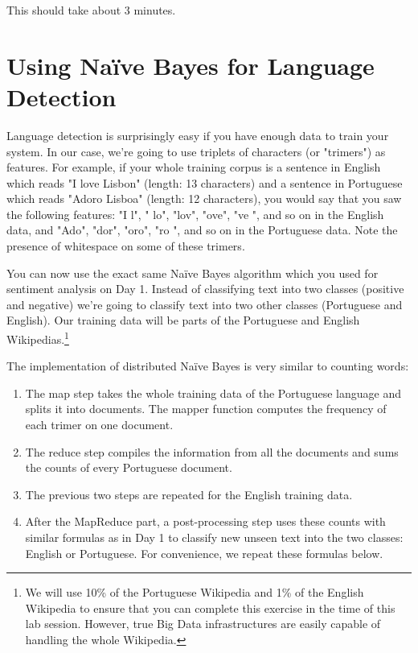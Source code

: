 This should take about 3 minutes.
\fi

\section{Using Na\"{i}ve Bayes for Language Detection}

Language detection is surprisingly easy if you have enough data to train your system. In our case, we're going to use triplets of characters (or "trimers") as features. For example, if your whole training corpus is a sentence in English which reads "I love Lisbon" (length: 13 characters) and a sentence in Portuguese which reads "Adoro Lisboa" (length: 12 characters), you would say that you saw the following features: "I l", " lo", "lov", "ove", "ve ", and so on in the English data, and "Ado", "dor", "oro", "ro ", and so on in the Portuguese data. Note the presence of whitespace on some of these trimers.

You can now use the exact same Na\"{i}ve Bayes algorithm which you used for sentiment analysis on Day 1. Instead of classifying text into two classes (positive and negative) we're going to classify text into two other classes (Portuguese and English). Our training data will be parts of the Portuguese and English Wikipedias.\footnote{We will use 10\% of the Portuguese Wikipedia and 1\% of the English Wikipedia to ensure that you can complete this exercise in the time of this lab session. However, true Big Data infrastructures are easily capable of handling the whole Wikipedia.}

The implementation of distributed Na\"{i}ve Bayes is very similar to counting words:
\begin{enumerate}
	\item The map step takes the whole training data of the Portuguese language and splits it into documents. The mapper function computes the frequency of each trimer on one document.
	\item The reduce step compiles the information from all the documents and sums the counts of every Portuguese document.
	\item The previous two steps are repeated for the English training data.
	\item After the MapReduce part, a post-processing step uses these counts with similar formulas as in Day 1 to classify new unseen text into the two classes: English or Portuguese. For convenience, we repeat these formulas below.
\end{enumerate}

